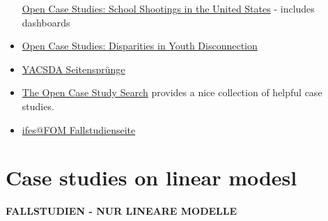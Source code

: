 \documentclass[
  letterpaper,
  DIV=11,
  numbers=noendperiod]{scrreprt}
\theoremstyle{definition}
\theoremstyle{definition}
\theoremstyle{remark}
\begin{document}
\begin{itemize}
  \href{https://www.opencasestudies.org/ocs-bp-school-shootings-dashboard/\#Motivation}{Open
  Case Studies: School Shootings in the United States} - includes
  dashboards
\item
  \href{https://www.opencasestudies.org/ocs-bp-youth-disconnection/}{Open
  Case Studies: Disparities in Youth Disconnection}
\item
  \href{https://data-se.netlify.app/2021/05/28/yacsda-seitenspr\%C3\%BCnge/}{YACSDA
  Seitensprünge}
\item
  \href{https://www.opencasestudies.org/}{The Open Case Study Search}
  provides a nice collection of helpful case studies.
\item
  \href{https://fallstudien.netlify.app/}{ifes@FOM Fallstudienseite}
\end{itemize}

\hypertarget{case-studies-on-linear-modesl}{%
\section{Case studies on linear
modesl}\label{case-studies-on-linear-modesl}}

\textbf{FALLSTUDIEN - NUR LINEARE MODELLE}
\end{document}
